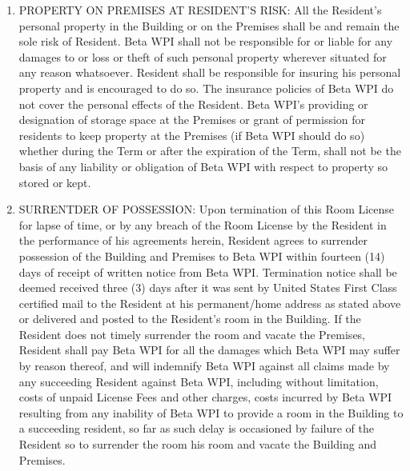 \documentclass[legalpaper, 12pt]{article} \usepackage{lease}
\begin{document}
\begin{enumerate}
        \item PROPERTY ON PREMISES AT RESIDENT'S RISK: All the Resident’s
                personal property in the Building or on the Premises shall be
                and remain the sole risk of Resident.  Beta WPI shall not be
                responsible for or liable for any damages to or loss or theft of
                such personal property wherever situated for any reason
                whatsoever.  Resident shall be responsible for insuring his
                personal property and is encouraged to do so.  The insurance
                policies of Beta WPI do not cover the personal effects of the
                Resident.  Beta WPI’s providing or designation of storage space
                at the Premises or grant of permission for residents to keep
                property at the Premises (if Beta WPI should do so) whether
                during the Term or after the expiration of the Term, shall not
                be the basis of any liability or obligation of Beta WPI with
                respect to property so stored or kept.

        \item SURRENTDER OF POSSESSION: Upon termination of this Room License
                for lapse of time, or by any breach of the Room License by the
                Resident in the performance of his agreements herein, Resident
                agrees to surrender possession of the Building and Premises to
                Beta WPI within fourteen (14) days of receipt of written notice
                from Beta WPI\@.  Termination notice shall be deemed received
                three (3) days after it was sent by United States First Class
                certified mail to the Resident at his permanent/home address as
                stated above or delivered and posted to the Resident’s room in
                the Building.  If the Resident does not timely surrender the
                room and vacate the Premises, Resident shall pay Beta WPI for
                all the damages which Beta WPI may suffer by reason thereof, and
                will indemnify Beta WPI against all claims made by any
                succeeding Resident against Beta WPI, including without
                limitation, costs of unpaid License Fees and other charges,
                costs incurred by Beta WPI resulting from any inability of Beta
                WPI to provide a room in the Building to a succeeding resident,
                so far as such delay is occasioned by failure of the Resident so
                to surrender the room his room and vacate the Building  and
                Premises.


\end{enumerate}
\end{document}
